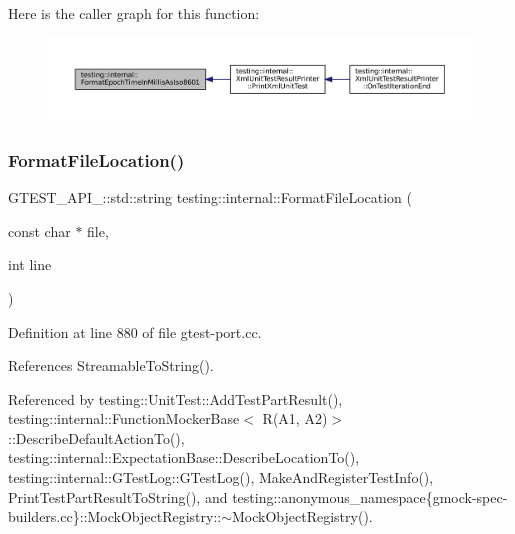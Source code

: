 Here is the caller graph for this function\+:
\nopagebreak
\begin{figure}[H]
\begin{center}
\leavevmode
\includegraphics[width=350pt]{namespacetesting_1_1internal_a5ef227c4a610e7ff638b12dfb25b068e_icgraph}
\end{center}
\end{figure}
\mbox{\label{namespacetesting_1_1internal_a31b7c3abed4a7c395f42c61e993989f4}} 
\subsubsection{\texorpdfstring{Format\+File\+Location()}{FormatFileLocation()}}
{\footnotesize\ttfamily G\+T\+E\+S\+T\+\_\+\+A\+P\+I\+\_\+\+::std\+::string testing\+::internal\+::\+Format\+File\+Location (\begin{DoxyParamCaption}\item[{const char $\ast$}]{file,  }\item[{int}]{line }\end{DoxyParamCaption})}



Definition at line 880 of file gtest-\/port.\+cc.



References Streamable\+To\+String().



Referenced by testing\+::\+Unit\+Test\+::\+Add\+Test\+Part\+Result(), testing\+::internal\+::\+Function\+Mocker\+Base$<$ R(\+A1, A2)$>$\+::\+Describe\+Default\+Action\+To(), testing\+::internal\+::\+Expectation\+Base\+::\+Describe\+Location\+To(), testing\+::internal\+::\+G\+Test\+Log\+::\+G\+Test\+Log(), Make\+And\+Register\+Test\+Info(), Print\+Test\+Part\+Result\+To\+String(), and testing\+::anonymous\+\_\+namespace\{gmock-\/spec-\/builders.\+cc\}\+::\+Mock\+Object\+Registry\+::$\sim$\+Mock\+Object\+Registry().



